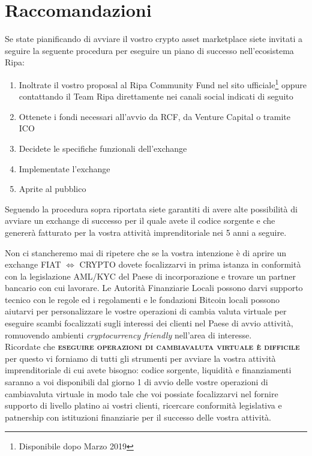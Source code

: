 \documentclass[11pt,fleqn]{book} %
\begin{document}
\section{Raccomandazioni}
Se state pianificando di avviare il vostro crypto asset marketplace siete invitati a seguire la seguente
procedura per eseguire un piano di successo nell'ecosistema Ripa:
\begin{enumerate}
	\item Inoltrate il vostro proposal al Ripa Community Fund nel sito ufficiale\footnote{Disponibile dopo Marzo 2019}
	oppure contattando il Team Ripa direttamente nei canali social indicati di seguito
	\item Ottenete i fondi necessari all'avvio da RCF, da Venture Capital o tramite ICO 
	\item Decidete le specifiche funzionali dell'exchange
	\item Implementate l'exchange
	\item Aprite al pubblico
\end{enumerate}

Seguendo la procedura sopra riportata siete garantiti di avere alte possibilità di avviare un exchange di 
successo per il quale avete il codice sorgente e che genererà fatturato per la vostra attività 
imprenditoriale nei 5 anni a seguire.

Non ci stancheremo mai di ripetere che se la vostra intenzione è di aprire un exchange FIAT $\Leftrightarrow$ CRYPTO 
dovete focalizzarvi in prima istanza in conformità con la legislazione AML/KYC del Paese di incorporazione
e trovare un partner bancario con cui lavorare. Le Autorità Finanziarie Locali possono darvi supporto tecnico
con le regole ed i regolamenti e le fondazioni Bitcoin locali possono aiutarvi per personalizzare le vostre
operazioni di cambia valuta virtuale per eseguire scambi focalizzati sugli interessi dei clienti nel Paese di avvio
attività, romuovendo ambienti \textit{cryptocurrency friendly} nell'area di interesse.\\

Ricordate che \textbf{\textsc{eseguire operazioni di cambiavaluta virtuale è difficile}} per questo vi forniamo di tutti
gli strumenti per avviare la vostra attività imprenditoriale di cui avete bisogno: codice sorgente,
liquidità e finanziamenti saranno a voi disponibili dal giorno 1 di avvio delle vostre operazioni di cambiavaluta virtuale
in modo tale che voi possiate focalizzarvi nel fornire supporto di livello platino ai vostri clienti, ricercare
conformità legislativa e patnership con istituzioni finanziarie per il successo delle vostra attività.
\end{document}
